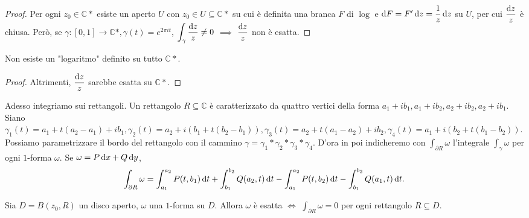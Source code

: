 \begin{proof}
  Per ogni $z_0 \in \mathbb{C}*$ esiste un aperto $U$ con $z_0 \in U \subseteq \mathbb{C}*$ su cui è definita una branca $F$ di $\log$ e $\mathop{}\!\mathrm{d} F=F'\mathop{}\!\mathrm{d} z=\dfrac{1}{z}\mathop{}\!\mathrm{d} z$ su $U$, per cui $\dfrac{\mathop{}\!\mathrm{d} z}{z}$ è chiusa.
  Però, se $\gamma:[0,1] \longrightarrow \mathbb{C}*, \gamma(t)=e^{2\pi it}$, $\displaystyle \int_{\gamma} \frac{\mathop{}\!\mathrm{d} z}{z}\not=0$ $\implies$ $\dfrac{\mathop{}\!\mathrm{d} z}{z}$ non è esatta.
\end{proof}

\begin{cor}
  Non esiste un "logaritmo" definito su tutto $\mathbb{C}*$.
\end{cor}

\begin{proof}
  Altrimenti, $\dfrac{\mathop{}\!\mathrm{d} z}{z}$ sarebbe esatta su $\mathbb{C}*$.
\end{proof}

Adesso integriamo sui rettangoli. Un rettangolo $R \subseteq \mathbb{C}$ è caratterizzato da quattro vertici della forma $a_1+ib_1, a_1+ib_2, a_2+ib_2, a_2+ib_1$. Siano $\gamma_1(t)=a_1+t(a_2-a_1)+ib_1, \gamma_2(t)=a_2+i(b_1+t(b_2-b_1)), \gamma_3(t)=a_2+t(a_1-a_2)+ib_2, \gamma_4(t)=a_1+i(b_2+t(b_1-b_2))$.
Possiamo parametrizzare il bordo del rettangolo con il cammino $\gamma=\gamma_1*\gamma_2*\gamma_3*\gamma_4$. D'ora in poi indicheremo con $\displaystyle \int_{\partial R} \omega$ l'integrale $\displaystyle \int_{\gamma} \omega$ per  ogni $1$-forma $\omega$. Se $\omega=P\mathop{}\!\mathrm{d} x+Q\mathop{}\!\mathrm{d} y$,
$$\int_{\partial R} \omega=\int_{a_1}^{a_2}P(t, b_1)\mathop{}\!\mathrm{d} t+\int_{b_1}^{b_2}Q(a_2, t)\mathop{}\!\mathrm{d} t-\int_{a_1}^{a_2}P(t, b_2)\mathop{}\!\mathrm{d} t-\int_{b_1}^{b_2}Q(a_1, t)\mathop{}\!\mathrm{d} t.$$

\begin{prop} \label{int=0no2}
  Sia $D=B(z_0, R)$ un disco aperto, $\omega$ una $1$-forma su $D$. Allora $\omega$ è esatta $\iff$ $\displaystyle \int_{\partial R} \omega=0$ per ogni rettangolo $R \subseteq D$.
\end{prop}

